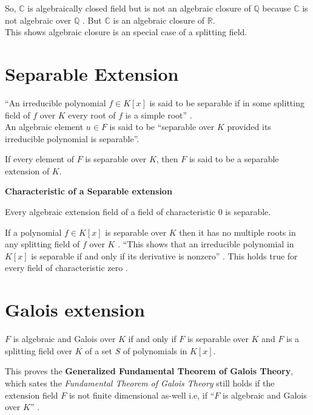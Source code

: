 So, \(\mathbb{C}\) is algebraically closed field but is not an algebraic closure of \(\mathbb{Q}\) because \(\mathbb{C}\) is not algebraic over \(\mathbb{Q}\) \cite{hunger}.
But \(\mathbb{C}\) is an algebraic closure of \(\mathbb{R}\).\\
This shows algebraic closure is an special case of a splitting field.

\section{Separable Extension}
``An irreducible polynomial \(f \in K[x]\) is said to be separable if in some splitting field of \(f\) over \(K\) every root of \(f\) is a simple root'' \cite{hunger}.\\
An algebraic element \(u \in F\) is said to be ``separable over \(K\) provided its irreducible polynomial is separable''\cite{hunger}.
\begin{definition} \cite{hunger}
  If every element of \(F\) is separable over \(K\), then \(F\) is said to be a separable extension of \(K\).
\end{definition}
\vspace{3mm}
\noindent
\textbf{Characteristic of a Separable extension}
\begin{remark} \cite{hunger}
  Every algebraic extension field of a field of characteristic \(0\) is separable.
  \end{remark}
If a polynomial \(f \in K[x]\) is separable over \(K\) then it has no multiple roots in any splitting field of \(f\) over \(K\) \cite{hunger}. ``This shows that an irreducible polynomial in \(K[x]\) is separable if and only if its derivative is nonzero'' \cite{hunger}. This holds true for every field of characteristic zero \cite{hunger}.

\section{Galois extension}
\begin{theorem} \cite{hunger}
  \(F\) is algebraic and Galois over \(K\) if and only if \(F\) is separable over \(K\) and \(F\) is a splitting field over \(K\) of a set \(S\) of polynomials in \(K[x]\).
  \end{theorem}

This proves the \textbf{Generalized Fundamental Theorem of Galois Theory},\\
which sates the \textit{Fundamental Theorem of Galois Theory} still holds if the extension field \(F\) is not finite dimensional as-well i.e, if ``\(F\) is algebraic and Galois over \(K\)'' \cite{hunger}.

